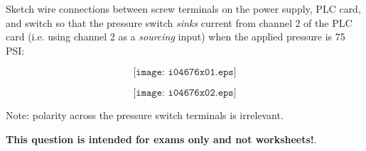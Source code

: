 

Sketch wire connections between screw terminals on the power supply, PLC card, and switch so that the pressure switch {\it sinks} current from channel 2 of the PLC card (i.e. using channel 2 as a {\it sourcing} input) when the applied pressure is 75 PSI:

$$\texttt{[image: i04676x01.eps]}$$







$$\texttt{[image: i04676x02.eps]}$$

Note: polarity across the pressure switch terminals is irrelevant.







{\bf This question is intended for exams only and not worksheets!}.


